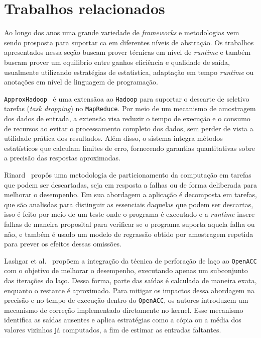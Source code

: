 \section{Trabalhos relacionados}\label{sec:trabRelac}

Ao longo dos anos uma grande variedade de \textit{frameworks} e metodologias vem sendo prosposta para suportar \gls{ca} em diferentes níveis de abstração. Os trabalhos apresentados nessa seção buscam prover técnicas em nível de \textit{runtime} e também buscam prover um equilibrío entre ganhos eficiência e qualidade de saída, usualmente utilizando estratégias de estatistíca, adaptação em tempo \textit{runtime} ou anotações em nível de linguagem de programação.

\texttt{ApproxHadoop}~\cite{goiri2015} é uma extensãoa ao \texttt{Hadoop} para suportar o descarte de seletivo tarefas (\textit{task dropping}) no \texttt{MapReduce}. Por meio de um mecanismo de amostragem dos dados de entrada, a extensão visa reduzir o tempo de execução e o consumo de recursos ao evitar o processamento completo dos dados, sem perder de vista a utilidade prática dos resultados. Além disso, o sistema integra métodos estatísticos que calculam limites de erro, fornecendo garantias quantitativas sobre a precisão das respostas aproximadas.

Rinard~\cite{rinard2006} propôs uma metodologia de particionamento da computação em tarefas que podem ser descartadas, seja em resposta a falhas ou de forma deliberada para melhorar o desempenho. Em sua abordagem a aplicação é decomposta em tarefas, que são analisdas para distinguir as essenciais daquelas que podem ser descartas, isso é feito por meio de um teste onde o programa é executado e a \textit{runtime} insere falhas de maneira proposital para verificar se o programa suporta aquela falha ou não, e também é usado um modelo de regrassão obtido por amostragem repetida para prever os efeitos dessas omissões.

Lashgar et al.~\cite{lashgar2018} propõem a integração da técnica de perforação de laço ao \texttt{OpenACC} com o objetivo de melhorar o desempenho, executando apenas um subconjunto das iterações do laço. Dessa forma, parte das saídas é calculada de maneira exata, enquanto o restante é aproximado. Para mitigar os impactos dessa abordagem na precisão e no tempo de execução dentro do \texttt{OpenACC}, os autores introduzem um mecanismo de correção implementado diretamente no kernel. Esse mecanismo identifica as saídas ausentes e aplica estratégias como a cópia ou a média dos valores vizinhos já computados, a fim de estimar as entradas faltantes.

